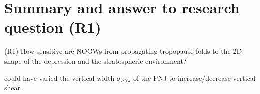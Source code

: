\section{Summary and answer to research question (R1)}

\begin{tcolorbox}[]
    (R1) How sensitive are NOGWs from propagating tropopause folds to the 2D shape of the depression and the stratospheric environment?
\end{tcolorbox}


could have varied the vertical width $\sigma_{PNJ}$ of the PNJ to increase/decrease vertical shear. 